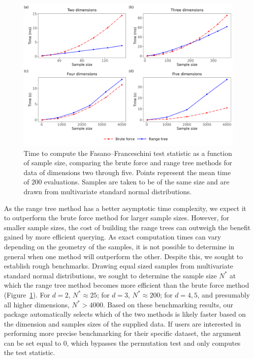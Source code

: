 \begin{figure}[htbp]
\centering
\includegraphics[scale=0.50]{figures/fig2.png}
\caption{Time to compute the Fasano--Franceschini test statistic as a function of sample size, comparing the brute force and range tree methods for data of dimensions two through five. Points represent the mean time of $200$ evaluations. Samples are taken to be of the same size and are drawn from multivariate standard normal distributions.}
\label{figure:stat_time}
\end{figure}

As the range tree method has a better asymptotic time complexity, we expect it to outperform the brute force method for larger sample sizes. However, for smaller sample sizes, the cost of building the range trees can outweigh the benefit gained by more efficient querying. As exact computation times can vary depending on the geometry of the samples, it is not possible to determine in general when one method will outperform the other. Despite this, we sought to establish rough benchmarks. Drawing equal sized samples from multivariate standard normal distributions, we sought to determine the sample size $N^{*}$ at which the range tree method becomes more efficient than the brute force method (Figure~\ref{figure:stat_time}). For $d=2$, $N^{*}\approx 25$; for $d=3$, $N^{*}\approx 200$; for $d=4,5$, and presumably all higher dimensions, $N^{*}>4000$. Based on these benchmarking results, our package automatically selects which of the two methods is likely faster based on the dimension and samples sizes of the supplied data. If users are interested in performing more precise benchmarking for their specific dataset, the argument  can be set equal to $0$, which bypasses the permutation test and only computes the test statistic.


